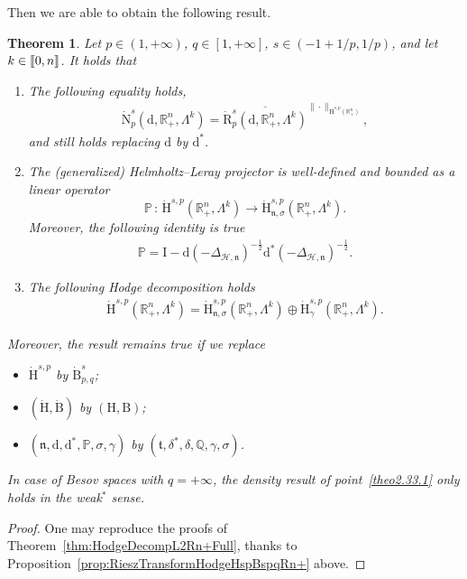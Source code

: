\documentclass[10pt]{amsart}
\newtheorem{theo}{Theorem}[section]
\theoremstyle{definition}\newtheorem{defi}[theo]{Definition}\newtheorem{rema}[theo]{Remark}\newtheorem{exam}[theo]{Example}\newtheorem{exem}[theo]{Example}\newtheorem{nota}[theo]{Notation}
\newcommand{\bbP}{\mathbb{P}}
\newcommand{\bbR}{\mathbb{R}}
\newcommand{\bbQ}{\mathbb{Q}}
\newcommand{\rmH}{\mathrm{H}}%
\newcommand{\rmB}{\mathrm{B}}
\newcommand{\rmd}{\mathrm{d}}
\newcommand{\rmR}{\mathrm{R}}
\newcommand{\rmN}{\mathrm{N}}
\newcommand{\rmI}{\mathrm{I}}
\newcommand{\clH}{\mathcal{H}}
\newcommand{\fkn}{\mathfrak{n}}
\newcommand{\fkt}{\mathfrak{t}}
\newcommand{\llbracket}{\mathopen{[\mkern -2.7mu[}}
\newcommand{\rrbracket}{\mathclose{]\mkern -2.7mu]}}
\newcommand{\llb}{\llbracket}
\newcommand{\rrb}{\rrbracket}
\newcommand*{\romanenumi}{\renewcommand*{\theenumi}{\roman{enumi}}}
\begin{document}
Then we are able to obtain the following result.

\begin{theo}\label{thm:HodgeDecompRn+}
Let $p\in(1,+\infty)$, $q\in[1,+\infty]$, $s\in(-1+1/p,1/p)$, and let $k\in\llb 0,n\rrb$. It holds that
\begin{enumerate}\romanenumi
\item\label{theo2.33.1} The following equality holds,
\begin{align*}
\dot{\rmN}^{s}_{p}\left(\rmd,\bbR^n_+,\Lambda^k\right) = \overline{\dot{\rmR}^{s}_{p}\left(\rmd,\bbR^n_+,\Lambda^k\right)}^{\|\cdot\|_{\dot{\rmH}^{s,p}\left(\bbR^n_+\right)}},
\end{align*}
and still holds replacing $\rmd$ by $\rmd^\ast$.

\item\label{theo2.33.2} The (generalized) Helmholtz--Leray projector is well-defined and bounded as a linear operator
\[
\bbP\,:\, \dot{\rmH}^{s,p}\left(\bbR^n_+,\Lambda^k\right)\longrightarrow \dot{\rmH}^{s,p}_{{\fkn},\sigma}\left(\bbR^n_+,\Lambda^k\right).
\]
Moreover, the following identity is true
\begin{align*}
\bbP = \rmI  - \rmd\left(-\Delta_{\clH,\fkn}\right)^{-\frac{1}{2}}\rmd^\ast\left(-\Delta_{\clH,\fkn}\right)^{-\frac{1}{2}} .
\end{align*}

\item\label{theo2.33.3} The following Hodge decomposition holds
\begin{align*}
\dot{\rmH}^{s,p}\left(\bbR^n_+,\Lambda^k\right) = \dot{\rmH}^{s,p}_{{\fkn},\sigma}\left(\bbR^n_+,\Lambda^k\right) \oplus \dot{\rmH}^{s,p}_{\gamma}\left(\bbR^n_+,\Lambda^k\right).
\end{align*}
\end{enumerate}
Moreover, the result remains true if we replace
\begin{itemize}
\item $\dot{\rmH}^{s,p}$ by $\dot{\rmB}^{s}_{p,q}$;
\item $(\dot{\rmH},\dot{\rmB})$ by $({\rmH},{\rmB})$;
\item $(\fkn,\rmd,\rmd^\ast,\bbP,\sigma,\gamma)$ by $(\fkt,\delta^\ast,\delta,\bbQ,\gamma,\sigma)$.
\end{itemize}
In case of Besov spaces with $q=+\infty$, the density result of point~\eqref{theo2.33.1} only holds in the weak${}^\ast$ sense.
\end{theo}


\begin{proof}
One may reproduce the proofs of Theorem~\ref{thm:HodgeDecompL2Rn+Full}, thanks to Proposition~\ref{prop:RieszTransformHodgeHspBspqRn+} above.
\end{proof}
\end{document}
